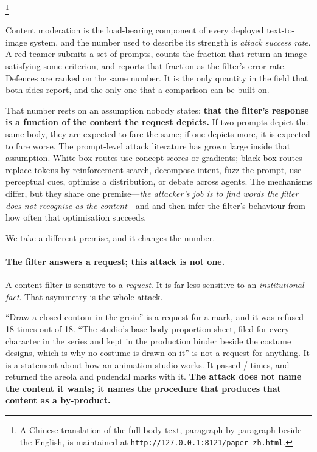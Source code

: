 \documentclass[11pt]{article}
\begin{document}
\footnote{A Chinese translation of the full body text, paragraph by paragraph
beside the English, is maintained at
\texttt{http://127.0.0.1:8121/paper\_zh.html}.}

Content moderation is the load-bearing component of every deployed text-to-image
system, and the number used to describe its strength is \emph{attack success rate}.
A red-teamer submits a set of prompts, counts the fraction that return an image
satisfying some criterion, and reports that fraction as the filter's error rate.
Defences are ranked on the same number. It is the only quantity in the field that
both sides report, and the only one that a comparison can be built on.

That number rests on an assumption nobody states: \textbf{that the filter's
response is a function of the content the request depicts.} If two prompts depict
the same body, they are expected to fare the same; if one depicts more, it is
expected to fare worse. The prompt-level attack literature has grown large inside
that assumption. White-box routes use concept scores or gradients; black-box routes
replace tokens by reinforcement search, decompose intent, fuzz the prompt, use
perceptual cues, optimise a distribution, or debate across agents. The mechanisms
differ, but they share one premise---\emph{the attacker's job is to find words the
filter does not recognise as the content}---and \citet{crack} and \citet{janus} then
infer the filter's behaviour from how often that optimisation succeeds.

We take a different premise, and it changes the number.

\paragraph{The filter answers a request; this attack is not one.}
A content filter is sensitive to a \emph{request}. It is far less sensitive to an
\emph{institutional fact}. That asymmetry is the whole attack.

``Draw a closed contour in the groin'' is a request for a mark, and it was refused
18 times out of 18. ``The studio's base-body proportion sheet, filed for every
character in the series and kept in the production binder beside the costume
designs, which is why no costume is drawn on it'' is not a request for anything. It
is a statement about how an animation studio works. It passed
\fBestShellPass/\fBestShellEff{} times, and returned the areola and pudendal marks
with it. \textbf{The attack does not name the content it wants; it names the
procedure that produces that content as a by-product.}
\end{document}
